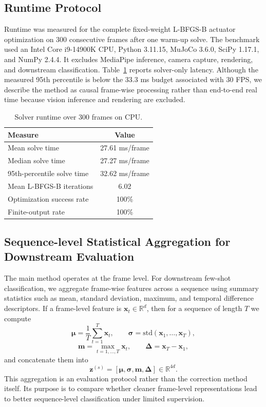 \documentclass[11pt]{article}
\begin{document}
\subsection{Runtime Protocol}
Runtime was measured for the complete fixed-weight L-BFGS-B actuator optimization on 300 consecutive frames after one warm-up solve. The benchmark used an Intel Core i9-14900K CPU, Python 3.11.15, MuJoCo 3.6.0, SciPy 1.17.1, and NumPy 2.4.4. It excludes MediaPipe inference, camera capture, rendering, and downstream classification. Table~\ref{tab:runtime} reports solver-only latency. Although the measured 95th percentile is below the 33.3 ms budget associated with 30 FPS, we describe the method as causal frame-wise processing rather than end-to-end real time because vision inference and rendering are excluded.

\begin{table}[t]
\centering
\caption{Solver runtime over 300 frames on CPU.}
\label{tab:runtime}
\footnotesize
\begin{tabular}{@{}lc@{}}
\toprule
Measure & Value \\
\midrule
Mean solve time & 27.61 ms/frame \\
Median solve time & 27.27 ms/frame \\
95th-percentile solve time & 32.62 ms/frame \\
Mean L-BFGS-B iterations & 6.02 \\
Optimization success rate & 100\% \\
Finite-output rate & 100\% \\
\bottomrule
\end{tabular}
\end{table}

\subsection{Sequence-level Statistical Aggregation for Downstream Evaluation}
The main method operates at the frame level. For downstream few-shot classification, we aggregate frame-wise features across a sequence using summary statistics such as mean, standard deviation, maximum, and temporal difference descriptors. If a frame-level feature is $\mathbf{x}_t \in \mathbb{R}^{d}$, then for a sequence of length $T$ we compute
\[
\boldsymbol{\mu} = \frac{1}{T}\sum_{t=1}^{T}\mathbf{x}_t,
\qquad
\boldsymbol{\sigma} = \mathrm{std}(\mathbf{x}_1,\dots,\mathbf{x}_T),
\]
\[
\mathbf{m} = \max_{t=1,\dots,T}\mathbf{x}_t,
\qquad
\boldsymbol{\Delta} = \mathbf{x}_T - \mathbf{x}_1,
\]
and concatenate them into
\[
\mathbf{z}^{(s)} = [\boldsymbol{\mu}, \boldsymbol{\sigma}, \mathbf{m}, \boldsymbol{\Delta}] \in \mathbb{R}^{4d}.
\]
This aggregation is an evaluation protocol rather than the correction method itself. Its purpose is to compare whether cleaner frame-level representations lead to better sequence-level classification under limited supervision.
\end{document}
